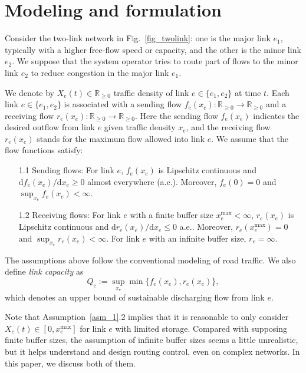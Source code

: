 \section{Modeling and formulation}
\label{sec_modeling}

Consider the two-link network in Fig.~\ref{fig_twolink}: one is the major link $e_1$, typically with a higher free-flow speed or capacity, and the other is the minor link $e_2$. We suppose that the system operator tries to route part of flows to the minor link $e_2$ to reduce congestion in the major link $e_1$.

We denote by $X_e(t)\in\mathbb{R}_{\geq0}$ traffic density of link $e\in\{e_1,e_2\}$ at time $t$. Each link $e\in\{e_1, e_2\}$ is associated with a sending flow $f_e(x_e):\mathbb{R}_{\geq0}\to\mathbb{R}_{\geq0}$ and a receiving flow $r_e(x_e):\mathbb{R}_{\geq0}\to\mathbb{R}_{\geq0}$. Here the sending flow $f_e(x_e)$ indicates the desired outflow from link $e$ given traffic density $x_e$, and the receiving flow $r_e(x_e)$ stands for the maximum flow allowed into link $e$. We assume that the flow functions satisfy:
\begin{asm}
\label{asm_1}
\quad

\begin{enumerate}
    \item[1.1] Sending flows: For link $e$, $f_e(x_e)$ is Lipschitz continuous and $\mathrm{d}f_e(x_e)/\mathrm{d}x_e\geq0$ almost everywhere (a.e.). Moreover, $f_e(0)=0$ and $\sup_{x_e}f_e(x_e)<\infty$.
    \item[1.2] Receiving flows: For link $e$ with a finite buffer size $x_e^{\max}<\infty$, $r_e(x_e)$ is Lipschitz continuous and $\mathrm{d}r_e(x_e)/\mathrm{d}x_e\leq0$ a.e.. Moreover, $r_e(x_e^{\max})=0$ and $\sup_{x_e}r_e(x_e)<\infty$. For link $e$ with an infinite buffer size, $r_e=\infty$. 
\end{enumerate}
\end{asm}

The assumptions above follow the conventional modeling of road traffic. We also define \emph{link capacity} as
\begin{equation}
    Q_e := \sup_{x_e} \min\{f_e(x_e), r_e(x_e)\},
\end{equation}
which denotes an upper bound of sustainable discharging flow from link $e$.

Note that Assumption~\ref{asm_1}.2 implies that it is reasonable to only consider $X_e(t)\in[0, x_e^{\max}]$ for link $e$ with limited storage. Compared with supposing finite buffer sizes, the assumption of infinite buffer sizes seems a little unrealistic, but it helps understand and design routing control, even on complex networks. In this paper, we discuss both of them.


